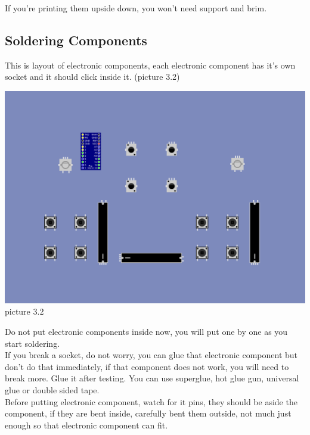 \documentclass[12pt, a4paper]{article}
\begin{document}
				\noindent If you're printing them upside down, you won't need support and brim.
				
		\subsection{Soldering Components}
			
			\noindent This is layout of electronic components, each electronic component has it's own socket and it should click inside it. (picture 3.2) \\
			
			\begin{center}
				\includegraphics[width=1\linewidth]{assets/illustrated_schematic_empty.png}
				picture 3.2
			\end{center} 
			
			\noindent Do not put electronic components inside now, you will put one by one as you start soldering. \\
			
			\noindent If you break a socket, do not worry, you can glue that electronic component but don't do that immediately, if that component does not work, you will need to break more. Glue it after testing. You can use superglue, hot glue gun, universal glue or double sided tape. \\ 
			
			\noindent Before putting electronic component, watch for it pins, they should be aside the component, if they are bent inside, carefully bent them outside, not much just enough so that electronic component can fit. \\
			
\end{document}
